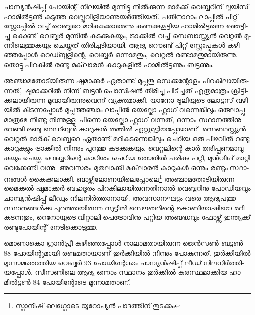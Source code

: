 ­ചാ­മ്പ്യന്‍­ഷി­പ്പ് പോ­യി­ന്റ് നി­ല­യില്‍ മു­ന്നി­ട്ടു നില്‍­ക്കു­ന്ന മാര്‍­ക്ക് വെ­ബ്ബ­റി­ന് ­ലൂ­യി­സ് ഹാ­മില്‍­ട്ടണ്‍ കടു­ത്ത 
വെ­ല്ലു­വി­ളി­യാ­ണു­യര്‍­ത്തി­യ­ത്.  പതി­നാ­റാം ലാ­പ്പില്‍ പി­റ്റ് സ്റ്റോ­പ്പില്‍ വച്ച് വെ­ബ്ബ­റെ മറി­ക­ട­ക്കാ­മെ­ന്നു കണ­ക്കു­കൂ­ട്ടിയ 
ഹാ­മില്‍­ട്ട­ണെ ഞെ­ട്ടി­ച്ചു കൊ­ണ്ട് വെ­ബ്ബര്‍ മു­ന്നില്‍ കട­ക്കു­ക­യും, ട്രാ­ക്കില്‍ വച്ച് ­സെ­ബാ­സ്റ്റ്യന്‍ വെ­റ്റല്‍ മു­ന്നി­ലെ­ത്തു­ക­യും 
ചെ­യ്ത­ത് തി­രി­ച്ച­ടി­യാ­യി. ആദ്യ റൌ­ണ്ട് പി­റ്റ് സ്റ്റോ­പ്പു­കള്‍ കഴി­ഞ്ഞ­പ്പോള്‍ റെ­ഡ്ബു­ളി­ന്റെ, വെ­ബ്ബര്‍ ഒന്നാ­മ­തും, 
വെ­റ്റല്‍ രണ്ടാ­മ­തു­മാ­യി­രു­ന്നു. തൊ­ട്ടു പി­റ­കില്‍ രണ്ടു മക്‌­ലാ­രന്‍ കാ­റു­ക­ളില്‍ ഹാ­മില്‍­ട്ട­ണും ബട്ട­ണും­.

അ­ഞ്ചാ­മ­തോ­ടി­യി­രു­ന്ന ഷു­മാ­ക്കര്‍ ഏതാ­ണ്ട് മു­പ്പ­തു സെ­ക്ക­ന്റോ­ളം പി­റ­കി­ലാ­യി­രു­ന്ന­ത്, ഷു­മാ­ക്ക­റില്‍ നി­ന്ന് ബട്ടന്‍ 
പൊ­സി­ഷന്‍ തി­രി­ച്ചു പി­ടി­ച്ച­ത് എത്ര­മാ­ത്രം ക്രി­ട്ടി­ക്ക­ലാ­യി­രു­ന്ന മൂ­വാ­യി­രു­ന്നു­വെ­ന്ന് വ്യ­ക്ത­മാ­ക്കി. യാ­നോ ട്രൂ­ലി­യു­ടെ 
ലോ­ട്ട­സ് വഴി­യില്‍ കി­ട­ന്ന­പ്പോള്‍ മു­പ്പ­ത്ത­ഞ്ചാം ലാ­പ്പില്‍ ­യെ­ല്ലോ ഫ്ലാ­ഗ് വന്നെ­ങ്കി­ലും ഒരു­ലാ­പ്പു മാ­ത്ര­മേ നീ­ണ്ടു നി­ന്നു­ള്ളൂ. 
പി­ന്നെ യെ­ല്ലോ ഫ്ലാ­ഗ് വന്ന­ത്, ഒന്നാം സ്ഥാ­ന­ത്തി­നു വേ­ണ്ടി രണ്ടു റെ­ഡ്ബുള്‍ കാ­റു­കള്‍ തമ്മില്‍ ഏറ്റു­മു­ട്ടി­യ­പ്പോ­ഴാ­ണ്. 
സെ­ബാ­സ്റ്റ്യന്‍ വെ­റ്റല്‍ മാര്‍­ക് വെ­ബ്ബ­റെ ഏതാ­ണ്ട് മറി­ക­ട­ന്നെ­ങ്കി­ലും ചെ­റിയ ഒരു പി­ഴ­വില്‍ റണ്ടു കാ­റു­ക­ളും ട്രാ­ക്കില്‍ 
നി­ന്നും പു­റ­ത്തു കട­ക്കു­ക­യും, വെ­റ്റ­ലി­ന്റെ കാര്‍ തരി­പ്പ­ണ­മാ­വു­ക­യും ചെ­യ്തു. വെ­ബ്ബ­റി­ന്റെ കാ­റി­നും ചെ­റിയ തോ­തില്‍ പരി­ക്കു 
പറ്റി, മുന്‍­വി­ങ് മാ­റ്റി വെ­ക്കേ­ണ്ടി വന്നു. അവ­സ­രം മു­ത­ലാ­ക്കി മക്‌­ലാ­രന്‍ കാ­റു­കള്‍ ഒന്നും രണ്ടും സ്ഥാ­ന­ങ്ങള്‍ കൈ­ക്ക­ലാ­ക്കി. 
ബാഴ്സിലോണയിലെപ്പോലെ\footnote{സ്പാനിഷ് ലെഗ്ഗോടെ യൂറോപ്യന്‍ പാദത്തിന് തുടക്കം} അഞ്ചാ­മ­തോ­ടി­യി­രു­ന്ന ­മൈ­ക്കല്‍ ഷു­മാ­ക്കര്‍ ബഹു­ദൂ­രം പി­റ­കി­ലാ­യി­രു­ന്ന­തി­നാല്‍ വെ­ബ്ബ­റി­നു 
പോ­ഡി­യ­വും ചാ­മ്പ്യന്‍­ഷി­പ്പ് ലീ­ഡും നി­ല­നിര്‍­ത്താ­നാ­യി. അവ­സാ­ന­ഘ­ട്ടം വരെ ആദ്യ­പ­ത്തു സ്ഥാ­ന­ങ്ങള്‍­ക്കു പു­റ­ത്താ­യി­രു­ന്ന 
സു­ട്ടില്‍ സൌ­ബ­റി­ന്റെ കൊ­ബി­യാ­ഷി­യെ മറി­ക­ട­ന്ന­തും, റെ­നോ­യു­ടെ വി­റ്റാ­ലി പെ­ട്രോ­വി­നു പറ്റിയ അബ­ദ്ധ­വും ഫോ­ഴ്സ് 
ഇന്ത്യ­ക്ക് രണ്ടു­പോ­യി­ന്റ് നേ­ടി­ക്കൊ­ടു­ത്തു­.

­മൊ­ണാ­കൊ ഗ്രാന്‍­പ്രീ കഴി­ഞ്ഞ­പ്പോള്‍ നാ­ലാ­മ­താ­യി­രു­ന്ന ­ജെന്‍­സണ്‍ ബട്ടണ്‍ 88 പോ­യി­ന്റു­മാ­യി രണ്ട­മ­താ­യാ­ണ് 
തുര്‍­ക്കി­യില്‍ നി­ന്നും പോ­കു­ന്ന­ത്. തുര്‍­ക്കി­യില്‍ മൂ­ന്നാ­മ­തെ­ത്തിയ വെ­ബ്ബര്‍ 93 പോ­യി­ന്റോ­ടെ ചാ­മ്പ്യന്‍­ഷി­പ്പ് ലീ­ഡ് 
നി­ല­നിര്‍­ത്തി­യ­പ്പോള്‍, സീ­സ­ണി­ലെ ആദ്യ ഒന്നാം സ്ഥാ­നം തുര്‍­ക്കില്‍ കര­സ്ഥ­മാ­ക്കിയ ഹാ­മില്‍­ട്ടണ്‍ 84 പോ­യി­ന്റോ­ടെ 
മൂ­ന്നാ­മ­താ­ണ്.


